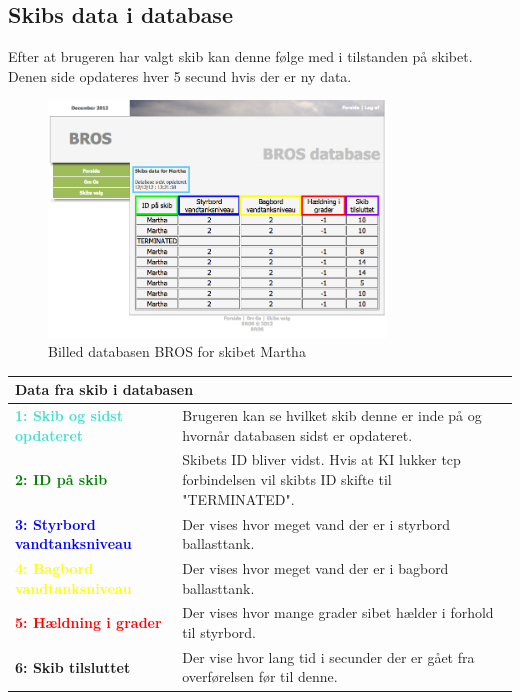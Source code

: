 \subsection*{Skibs data i database}
Efter at brugeren har valgt skib kan denne følge med i tilstanden på skibet. Denen side opdateres hver 5 secund hvis der er ny data.
\begin{figure}[H]
	\centering
	\includegraphics[width=0.8\textwidth]{billeder/database/web_database}
	\caption{Billed databasen BROS for skibet Martha}
	\label{fig:web_database}
\end{figure}
\begin{table}[H]
\begin{tabular}{l p{12.5cm}}

\multicolumn{2}{l}{Data fra skib i databasen } \\
\hline
\textcolor{Turquoise}{\textbf{1: Skib og sidst opdateret}}
&Brugeren kan se hvilket skib denne er inde på og hvornår databasen sidst er opdateret.\\
\textcolor{green}{\textbf{2: ID på skib}}
&Skibets ID bliver vidst. Hvis at KI lukker tcp forbindelsen vil skibts ID skifte til "TERMINATED".\\
\textcolor{blue}{\textbf{3: Styrbord vandtanksniveau}}
&Der vises hvor meget vand der er i styrbord ballasttank.\\
\textcolor{yellow}{\textbf{4: Bagbord vandtanksniveau}}
&Der vises hvor meget vand der er i bagbord ballasttank.\\
\textcolor{red}{\textbf{5: Hældning i grader}}
&Der vises hvor mange grader sibet hælder i forhold til styrbord.\\
\textcolor{RoyalPurple}{\textbf{6: Skib tilsluttet}}
&Der vise hvor lang tid i secunder der er gået fra overførelsen før til denne.\\
\end{tabular}
\end{table}

